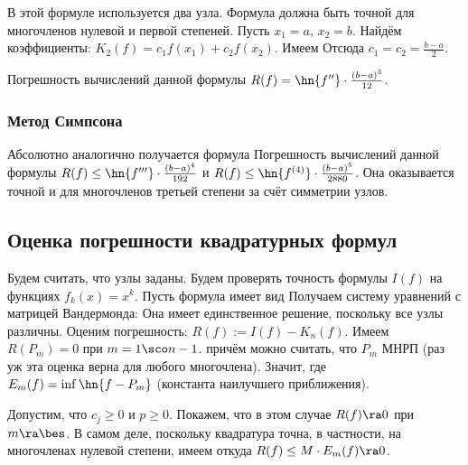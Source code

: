 \documentclass[a4paper]{article}
\begin{document}
В этой формуле используется два узла. Формула должна быть точной для
многочленов нулевой и первой степеней. Пусть $x_1= a$, $x_2 =
b$. Найдём коэффициенты: $K_2(f) = c_1f(x_1) + c_2 f(x_2)$.  Имеем
Отсюда $c_1 = c_2 = \frac{b-a}{2}$.

Погрешность вычислений данной формулы $R(f) = \hn{f''}\cdot
\frac{(b-a)^3}{12}$.

\subsubsection{Метод Симпсона}

Абсолютно аналогично получается формула 
Погрешность вычислений данной формулы $R(f) \le \hn{f'''}\cdot
\frac{(b-a)^4}{192}$ и $R(f) \le \hn{f^{(4)}}\cdot
\frac{(b-a)^5}{2880}$.  Она оказывается точной и для многочленов
третьей степени за счёт симметрии узлов.

\subsection{Оценка погрешности квадратурных формул}

Будем считать, что узлы заданы. Будем проверять точность формулы
$I(f)$ на функциях $f_k(x) = x^k$. Пусть формула имеет вид   Получаем систему уравнений с матрицей
Вандермонда:   Она имеет единственное решение,
поскольку все узлы различны.  Оценим погрешность: $R(f) :=
I(f)-K_n(f)$. Имеем $R(P_m) = 0$ при $m=1\sco n-1$.   причём можно считать, что
$P_m$ МНРП (раз уж эта оценка верна для любого многочлена).  Значит,
 где $E_m(f) =
\inf \hn{f - P_m}$ (константа наилучшего приближения).

Допустим, что $c_j \ge 0$ и $p \ge 0$.  Покажем, что в этом случае
$R(f)\ra 0$ при $m\ra \bes$.  В самом деле, поскольку квадратура
точна, в частности, на многочленах нулевой степени, имеем  откуда $R(f) \le M \cdot E_m(f) \ra 0$.
\end{document}
